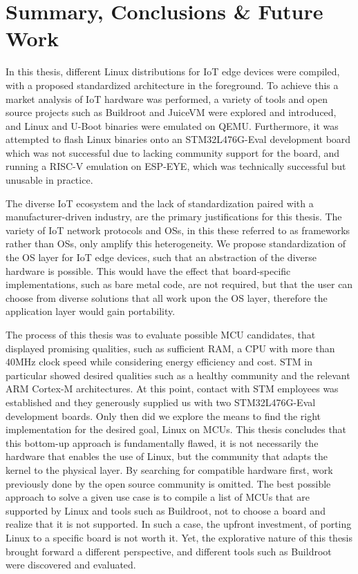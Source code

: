 \chapter{Summary, Conclusions \& Future Work}

In this thesis, different Linux distributions for IoT edge devices were compiled, with a proposed standardized architecture in the foreground. To achieve this a market analysis of IoT hardware was performed, a variety of tools and open source projects such as Buildroot and JuiceVM were explored and introduced, and Linux and U-Boot binaries were emulated on QEMU. Furthermore, it was attempted to flash Linux binaries onto an STM32L476G-Eval development board which was not successful due to lacking community support for the board, and running a RISC-V emulation on ESP-EYE, which was technically successful but unusable in practice.

The diverse IoT ecosystem and the lack of standardization paired with a manufacturer-driven industry, are the primary justifications for this thesis. The variety of IoT network protocols and OSs, in this these referred to as frameworks rather than OSs, only amplify this heterogeneity. We propose standardization of the OS layer for IoT edge devices, such that an abstraction of the diverse hardware is possible. This would have the effect that board-specific implementations, such as bare metal code, are not required, but that the user can choose from diverse solutions that all work upon the OS layer, therefore the application layer would gain portability.

The process of this thesis was to evaluate possible MCU candidates, that displayed promising qualities, such as sufficient RAM, a CPU with more than 40MHz clock speed while considering energy efficiency and cost. STM in particular showed desired qualities such as a healthy community and the relevant ARM Cortex-M architectures. At this point, contact with STM employees was established and they generously supplied us with two STM32L476G-Eval development boards. Only then did we explore the means to find the right implementation for the desired goal, Linux on MCUs. This thesis concludes that this bottom-up approach is fundamentally flawed, it is not necessarily the hardware that enables the use of Linux, but the community that adapts the kernel to the physical layer. By searching for compatible hardware first, work previously done by the open source community is omitted. The best possible approach to solve a given use case is to compile a list of MCUs that are supported by Linux and tools such as Buildroot, not to choose a board and realize that it is not supported. In such a case, the upfront investment, of porting Linux to a specific board is not worth it. Yet, the explorative nature of this thesis brought forward a different perspective, and different tools such as Buildroot were discovered and evaluated.

